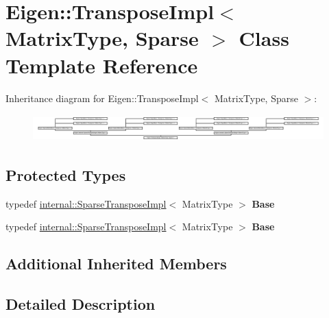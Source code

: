 \hypertarget{class_eigen_1_1_transpose_impl_3_01_matrix_type_00_01_sparse_01_4}{}\section{Eigen\+:\+:Transpose\+Impl$<$ Matrix\+Type, Sparse $>$ Class Template Reference}
\label{class_eigen_1_1_transpose_impl_3_01_matrix_type_00_01_sparse_01_4}
Inheritance diagram for Eigen\+:\+:Transpose\+Impl$<$ Matrix\+Type, Sparse $>$\+:\begin{figure}[H]
\begin{center}
\leavevmode
\includegraphics[height=1.057402cm]{class_eigen_1_1_transpose_impl_3_01_matrix_type_00_01_sparse_01_4}
\end{center}
\end{figure}
\subsection*{Protected Types}
\begin{DoxyCompactItemize}
\item 
\mbox{\label{class_eigen_1_1_transpose_impl_3_01_matrix_type_00_01_sparse_01_4_a76758b6e667130ceae02fe388051d4f8}} 
typedef \hyperlink{class_eigen_1_1internal_1_1_sparse_transpose_impl}{internal\+::\+Sparse\+Transpose\+Impl}$<$ Matrix\+Type $>$ {\bfseries Base}
\item 
\mbox{\label{class_eigen_1_1_transpose_impl_3_01_matrix_type_00_01_sparse_01_4_a76758b6e667130ceae02fe388051d4f8}} 
typedef \hyperlink{class_eigen_1_1internal_1_1_sparse_transpose_impl}{internal\+::\+Sparse\+Transpose\+Impl}$<$ Matrix\+Type $>$ {\bfseries Base}
\end{DoxyCompactItemize}
\subsection*{Additional Inherited Members}


\subsection{Detailed Description}
